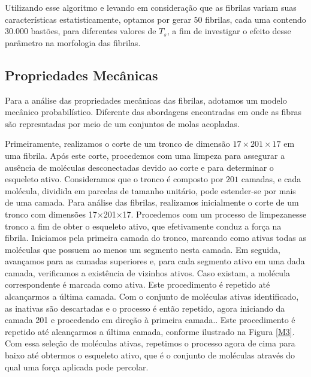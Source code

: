 \documentclass{article}
\begin{document}
        Utilizando esse algoritmo e levando em consideração que as fibrilas variam suas características estatisticamente, optamos por gerar 
        \(50\) fibrilas, cada uma contendo \(30.000\) bastões, para diferentes valores de \(T_{s}\), a fim de investigar 
        o efeito desse parâmetro na morfologia das fibrilas. 


    \subsection{Propriedades Mecânicas} 

        Para a análise das propriedades mecânicas das fibrilas, adotamos um modelo mecânico probabilístico\cite{Parkinson1997}. 
        Diferente das abordagens encontradas em \cite{Saitoh2020MolecularDS} onde as fibras são represntadas por meio de um 
        conjuntos de molas acopladas.
        

        Primeiramente, realizamos o corte de um tronco de dimensão \(17 \times 201 \times 17\) em uma fibrila. Após este 
        corte, procedemos com uma limpeza para assegurar a ausência de moléculas desconectadas devido ao corte e para 
        determinar o esqueleto ativo. Consideramos que o tronco é composto por \(201\) camadas, e cada molécula, dividida 
        em parcelas de tamanho unitário, pode estender-se por mais de uma camada. Para análise das fibrilas, realizamos 
        inicialmente o corte de um tronco com dimensões 17×201×17. Procedemos com um processo de limpezanesse tronco a fim 
        de obter o esqueleto ativo, que efetivamente conduz a força na fibrila. Iniciamos pela primeira camada do tronco, 
        marcando como ativas todas as moléculas que possuem ao menos um segmento nesta camada. Em seguida, avançamos para 
        as camadas superiores e, para cada segmento ativo em uma dada camada, verificamos a existência de vizinhos ativos. 
        Caso existam, a molécula correspondente é marcada como ativa. Este procedimento é repetido até alcançarmos a última 
        camada. Com o conjunto de moléculas ativas identificado, as inativas são descartadas e o processo é então repetido, 
        agora iniciando da camada 201 e procedendo em direção à primeira camada.. Este procedimento é repetido até alcançarmos a última camada, conforme 
        ilustrado na Figura \ref{M3}. Com essa seleção de moléculas ativas, repetimos o processo agora de cima para baixo 
        até obtermos o esqueleto ativo, que é o conjunto de moléculas através do qual uma força aplicada pode percolar. 
\end{document}
